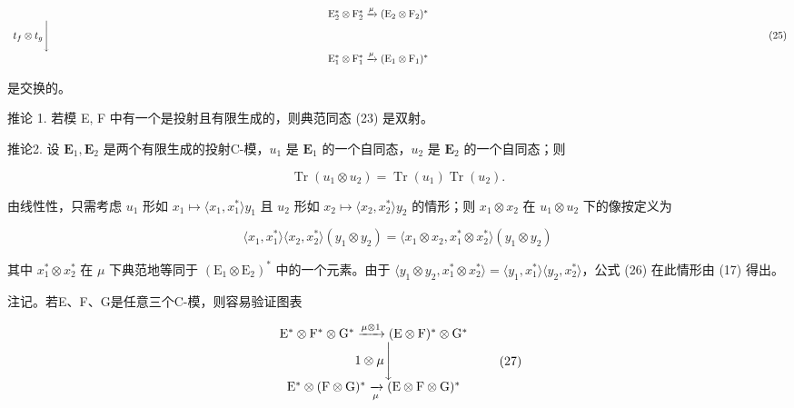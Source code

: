\[
\begin{array}{c} \mathrm{E} _ {2} ^ {*} \otimes \mathrm{F} _ {2} ^ {*} \xrightarrow {\mu} (\mathrm{E} _ {2} \otimes \mathrm{F} _ {2}) ^ {*} \\ t _ {f} \otimes t _ {g} \Biggl \downarrow \qquad \qquad \qquad \qquad \qquad \qquad \qquad \qquad \qquad \qquad \qquad \qquad \qquad \qquad \qquad \qquad \qquad \qquad \qquad \qquad \qquad \qquad \qquad \qquad \qquad \qquad \qquad \qquad \qquad \qquad \qquad \qquad \qquad \qquad \\ \mathrm{E} _ {1} ^ {*} \otimes \mathrm{F} _ {1} ^ {*} \xrightarrow {\mu} (\mathrm{E} _ {1} \otimes \mathrm{F} _ {1}) ^ {*} \end{array}\tag{25}
\]

是交换的。

推论 1. 若模 E, F 中有一个是投射且有限生成的，则典范同态 (23) 是双射。

推论2. 设 \(\mathbf{E}_1, \mathbf{E}_2\) 是两个有限生成的投射C-模，\(u_1\) 是 \(\mathbf{E}_1\) 的一个自同态，\(u_2\) 是 \(\mathbf{E}_2\) 的一个自同态；则

\[
\operatorname{Tr} (u _ {1} \otimes u _ {2}) = \operatorname{Tr} (u _ {1}) \operatorname{Tr} (u _ {2}).\tag{26}
\]

由线性性，只需考虑 \(u_{1}\) 形如 \(x_{1} \mapsto \langle x_{1}, x_{1}^{*} \rangle y_{1}\) 且 \(u_{2}\) 形如 \(x_{2} \mapsto \langle x_{2}, x_{2}^{*} \rangle y_{2}\) 的情形；则 \(x_{1} \otimes x_{2}\) 在 \(u_{1} \otimes u_{2}\) 下的像按定义为

\[
\langle x _ {1}, x _ {1} ^ {*} \rangle \langle x _ {2}, x _ {2} ^ {*} \rangle (y _ {1} \otimes y _ {2}) = \langle x _ {1} \otimes x _ {2}, x _ {1} ^ {*} \otimes x _ {2} ^ {*} \rangle (y _ {1} \otimes y _ {2})
\]

其中 \(x_{1}^{*}\otimes x_{2}^{*}\) 在 \(\mu\) 下典范地等同于 \((\mathrm{E}_{1}\otimes\mathrm{E}_{2})^{*}\) 中的一个元素。由于 \(\langle y_{1}\otimes y_{2},x_{1}^{*}\otimes x_{2}^{*}\rangle=\langle y_{1},x_{1}^{*}\rangle\langle y_{2},x_{2}^{*}\rangle\)，公式 (26) 在此情形由 (17) 得出。

注记。若E、F、G是任意三个C-模，则容易验证图表

\[
\begin{array}{c} \mathrm{E} ^ {*} \otimes \mathrm{F} ^ {*} \otimes \mathrm{G} ^ {*} \xrightarrow {\mu \otimes 1} (\mathrm{E} \otimes \mathrm{F}) ^ {*} \otimes \mathrm{G} ^ {*} \\ 1 \otimes \mu \Biggl \downarrow \\ \mathrm{E} ^ {*} \otimes (\mathrm{F} \otimes \mathrm{G}) ^ {*} \xrightarrow [ \mu ]{} (\mathrm{E} \otimes \mathrm{F} \otimes \mathrm{G}) ^ {*} \end{array}\tag{27}
\]

